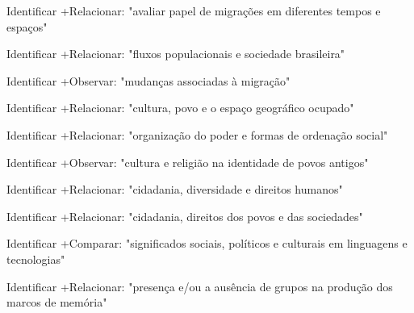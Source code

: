  Identificar +Relacionar: "avaliar papel de migrações em diferentes tempos e espaços"

 Identificar +Relacionar: "fluxos populacionais e sociedade brasileira"

 Identificar +Observar: "mudanças associadas à migração"

 Identificar +Relacionar: "cultura, povo e o espaço geográfico ocupado"

 Identificar +Relacionar: "organização do poder e formas de ordenação social"

 Identificar +Observar: "cultura e religião na identidade de povos antigos"

 Identificar +Relacionar: "cidadania, diversidade e direitos humanos"

 Identificar +Relacionar: "cidadania, direitos dos povos e das sociedades"

 Identificar +Comparar: "significados sociais, políticos e culturais em linguagens e tecnologias"

 Identificar +Relacionar: "presença e/ou a ausência de grupos na produção dos marcos de memória"

